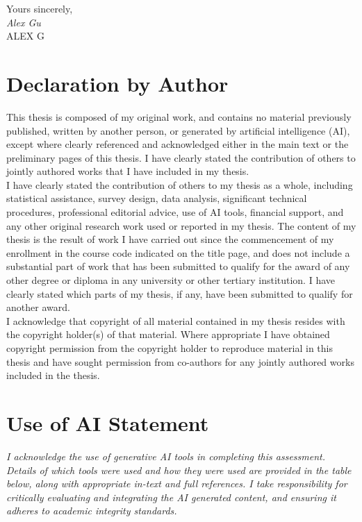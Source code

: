 \documentclass[12pt,openany,a4paper]{book}
\begin{document}
\begin{flushright}
	Yours sincerely,\\
	\medskip
	\emph{Alex Gu}\\
	\medskip
	ALEX G
\end{flushright}

\chapter{Declaration by Author}

This thesis is composed of my original work, and contains no material previously published, written by another person, or generated by artificial intelligence (AI), except where clearly referenced and acknowledged either in the main text or the preliminary pages of this thesis. I have clearly stated the contribution of others to jointly authored works that I have included in my thesis.\\

I have clearly stated the contribution of others to my thesis as a whole, including statistical assistance, survey design, data analysis, significant technical procedures, professional editorial advice, use of AI tools, financial support, and any other original research work used or reported in my thesis. The content of my thesis is the result of work I have carried out since the commencement of my enrollment in the course code indicated on the title page, and does not include a substantial part of work that has been submitted to qualify for the award of any other degree or diploma in any university or other tertiary institution. I have clearly stated which parts of my thesis, if any, have been submitted to qualify for another award.\\

I acknowledge that copyright of all material contained in my thesis resides with the copyright holder(s) of that material. Where appropriate I have obtained copyright permission from the copyright holder to reproduce material in this thesis and have sought permission from co-authors for any jointly authored works included in the thesis.

\chapter{Use of AI Statement}


\emph{I acknowledge the use of generative AI tools in completing this
assessment. Details of which tools were used and how they were used are
provided in the table below, along with appropriate in-text and full
references. I take responsibility for critically evaluating and
integrating the AI generated content, and ensuring it adheres to
academic integrity standards.}
\end{document}
